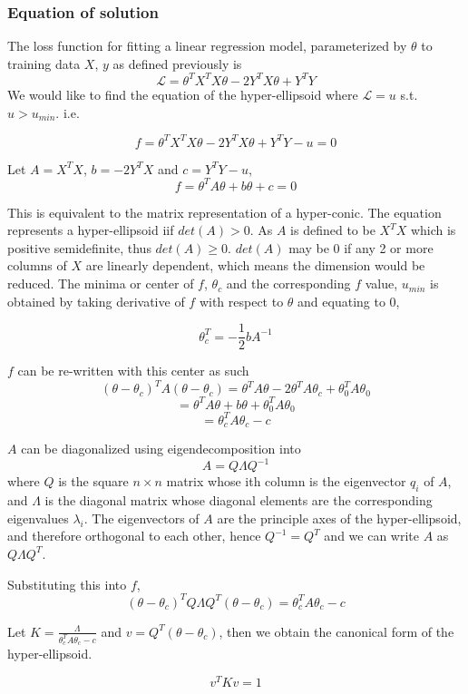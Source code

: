 \documentclass{article}
\begin{document}
\subsubsection{Equation of solution}
The loss function for fitting a linear regression model, parameterized by $\theta$ to training data $X$, $y$ as defined previously is
\[
\mathcal{L} = \theta^T X^T X\theta - 2Y^T X\theta + Y^T Y
\]
We would like to find the equation of the hyper-ellipsoid where $\mathcal{L} = u$ s.t. $u > u_{min}$. i.e.

\[
f = \theta^T X^T X\theta - 2Y^T X\theta + Y^T Y - u = 0
\]

Let $A = X^T X$, $b = -2Y^T X$ and $c = Y^T Y - u$,
\[
f = \theta^T A\theta + b\theta + c = 0
\]

This is equivalent to the matrix representation of a hyper-conic. The equation represents a hyper-ellipsoid iif $det(A) > 0$. As $A$ is defined to be $X^T X$ which is positive semidefinite, thus $det(A) \geq 0$. $det(A)$ may be $0$ if any 2 or more columns of $X$ are linearly dependent, which means the dimension would be reduced. The minima or center of $f$, $\theta_c$ and the corresponding $f$ value, $u_{min}$ is obtained by taking derivative of $f$ with respect to $\theta$ and equating to $0$,

\[
\theta_c^T = -\frac{1}{2}bA^{-1}
\]

$f$ can be re-written with this center as such
\[
(\theta - \theta_c)^T A (\theta - \theta_c) = \theta^T A \theta - 2\theta^T A \theta_c + \theta_0^T A \theta_0
\]
\[
= \theta^T A \theta + b\theta + \theta_0^T A \theta_0
\]
\[
= \theta_c^T A \theta_c - c
\]

$A$ can be diagonalized using eigendecomposition into 
\[
A = Q\Lambda Q^{-1}
\]
where $Q$ is the square $n \times n$ matrix whose ith column is the eigenvector $q_i$ of $A$, and $\Lambda$ is the diagonal matrix whose diagonal elements are the corresponding eigenvalues $\lambda_i$. The eigenvectors of $A$ are the principle axes of the hyper-ellipsoid, and therefore orthogonal to each other, hence $Q^{-1} = Q^T$ and we can write $A$ as $Q \Lambda Q^{T}$.

Substituting this into $f$,
\[
(\theta - \theta_c)^T Q\Lambda Q^T (\theta - \theta_c) = \theta_c^T A \theta_c - c
\]

Let $K=\frac{\Lambda}{\theta_c^T A \theta_c - c}$ and $v = Q^T(\theta - \theta_c)$, then we obtain the canonical form of the hyper-ellipsoid.

\[
v^T K v = 1
\]
\end{document}
